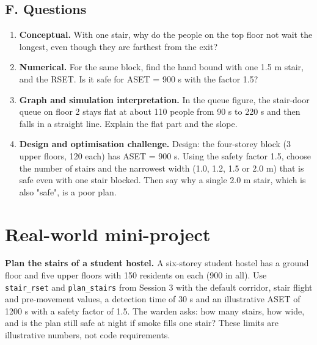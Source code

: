 \documentclass[11pt,a4paper]{article}
\begin{document}
\subsection*{F. Questions}
\begin{enumerate}[nosep]
\item \textbf{Conceptual.} With one stair, why do the people on the top floor not wait the longest, even though they are farthest from the exit?
\item \textbf{Numerical.} For the same block, find the hand bound with one 1.5 m stair, and the RSET. Is it safe for ASET = 900 s with the factor 1.5?
\item \textbf{Graph and simulation interpretation.} In the queue figure, the stair-door queue on floor 2 stays flat at about 110 people from 90 s to 220 s and then falls in a straight line. Explain the flat part and the slope.
\item \textbf{Design and optimisation challenge.} Design: the four-storey block (3 upper floors, 120 each) has ASET = 900 s. Using the safety factor 1.5, choose the number of stairs and the narrowest width (1.0, 1.2, 1.5 or 2.0 m) that is safe even with one stair blocked. Then say why a single 2.0 m stair, which is also "safe", is a poor plan.
\end{enumerate}

\section{Real-world mini-project}
\textbf{Plan the stairs of a student hostel.} A six-storey student hostel has a ground floor and five upper floors with 150 residents on each (900 in all). Use \texttt{stair\_rset} and \texttt{plan\_stairs} from Session 3 with the default corridor, stair flight and pre-movement values, a detection time of 30 s and an illustrative ASET of 1200 s with a safety factor of 1.5. The warden asks: how many stairs, how wide, and is the plan still safe at night if smoke fills one stair? These limits are illustrative numbers, not code requirements.
\end{document}
